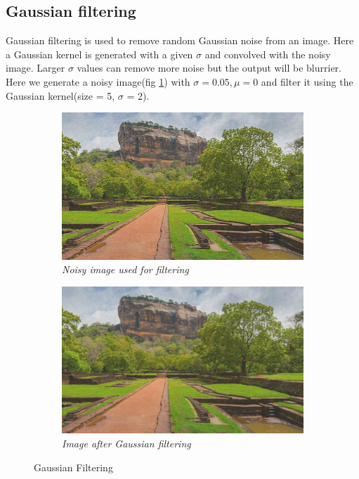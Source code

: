 \documentclass[11pt, a4paper]{article}
\begin{document}
\subsection{Gaussian filtering}
\begin{minipage}{.34\textwidth}
Gaussian filtering is used to remove random Gaussian noise from an image. Here a Gaussian kernel is generated with a given $\sigma$ and convolved with the noisy image. Larger $\sigma$ values can remove more noise but the output will be blurrier. Here we generate a noisy image(fig \ref{fig:Noisy image}) with $\sigma=0.05, \mu=0$ and filter it using the Gaussian kernel(size = 5, $\sigma$ = 2).
\end{minipage}
\hfill
\begin{minipage}{0.64\textwidth}
\begin{figure}[H]
	\centering
	\begin{subfigure}[b]{0.48\textwidth}
		\centering
		\includegraphics[width=\textwidth]{./Outputs/Noisy_Image.png}
		\caption{{\small \textit{Noisy image used for filtering}}}
		\label{fig:Noisy image}
	\end{subfigure}
	\hfill
	\begin{subfigure}[b]{0.48\textwidth}
		\centering
		\includegraphics[width=\textwidth]{./Outputs/Gauss_filt_Image.png}
		\caption{{\small \textit{Image after Gaussian filtering}}}
		\label{fig:Gaussian Image}
	\end{subfigure}
	\caption{Gaussian Filtering}
\end{figure}
\end{minipage}
\end{document}
